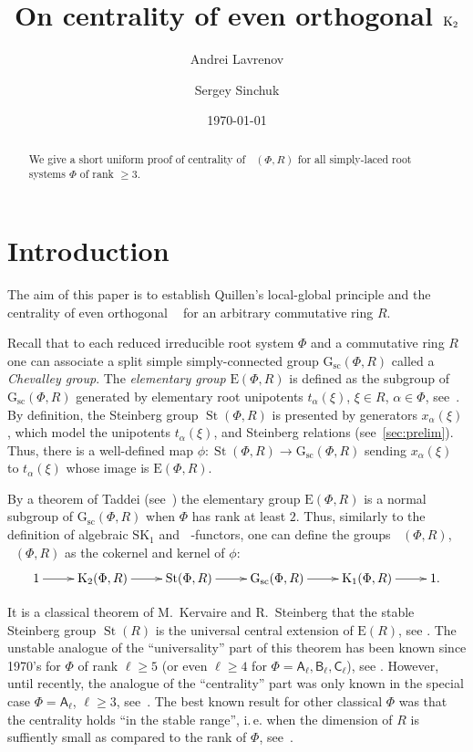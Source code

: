 \documentclass[11pt]{amsart}
\title{On centrality of even orthogonal $\Kt$}
\author {Andrei Lavrenov}
\author{Sergey Sinchuk}
\date {\today}
\theoremstyle{plain} \declaretheorem[name=Theorem, Refname={Theorem,Theorems}]{tm} \Crefname{tm}{Theorem}{Theorems}
\numberwithin{equation}{section}
\theoremstyle{definition} \newtheorem{df}[lm]{Definition} \Crefname{df}{Definition}{Definitions}
\theoremstyle{remark} \newtheorem{rk}[lm]{Remark} \Crefname{rk}{Remark}{Remarks}
\newcommand{\E}{{\mathrm{E}}}
\newcommand{\GG}{{\mathrm{G}_{\mathrm{sc}}}}
\newcommand{\St}{\mathop{\mathrm{St}}\nolimits}
\newcommand{\Kt}{\mathop{\mathrm{K_2}}\nolimits}
\newcommand{\Ko}{\mathop{\mathrm{K_1}}\nolimits}
\newcommand{\rA}{\mathsf{A}}
\newcommand{\rB}{\mathsf{B}}
\newcommand{\rC}{\mathsf{C}}
\begin{document}
\begin{abstract} We give a short uniform proof of centrality of $\Kt(\Phi, R)$ for all simply-laced root systems $\Phi$ of rank $\geq 3$.
\end{abstract}

\maketitle

\section*{Introduction}
The aim of this paper is to establish Quillen's local-global principle and the centrality of even orthogonal $\Kt$ for an arbitrary commutative ring $R$.

Recall that to each reduced irreducible root system $\Phi$ and a commutative ring $R$ one can associate a split simple simply-connected group $\GG(\Phi, R)$ called a \emph{Chevalley group}.
The {\it elementary group} $\E(\Phi, R)$ is defined as the subgroup of $\GG(\Phi, R)$ generated by elementary root unipotents $t_\alpha(\xi)$, $\xi\in R$, $\alpha\in \Phi$, see~\cite{Ta, St78}.
By definition, the Steinberg group $\St(\Phi, R)$ is presented by generators $x_\alpha(\xi)$, which model the unipotents $t_\alpha(\xi)$, and Steinberg relations (see~\cref{sec:prelim}). 
Thus, there is a well-defined map $\phi\colon\St(\Phi, R)\to \GG(\Phi, R)$ sending $x_\alpha(\xi)$ to $t_\alpha(\xi)$ whose image is $\E(\Phi, R)$.

By a theorem of Taddei (see~\cite{Ta}) the elementary group $\E(\Phi, R)$ is a normal subgroup of $\GG(\Phi, R)$ when $\Phi$ has rank at least $2$.
Thus, similarly to the definition of algebraic $\mathrm{SK}_1$ and $\Kt$-functors, one can define the groups $\Ko(\Phi, R)$, $\Kt(\Phi, R)$ as the cokernel and kernel of $\phi$:
$$\xymatrix{1 \ar[r] & \Kt(\Phi, R) \ar[r] & \St(\Phi, R) \ar[r] & \GG(\Phi, R) \ar[r] & \Ko(\Phi, R) \ar[r] & 1.}$$

It is a classical theorem of M.~Kervaire and R.~Steinberg that the stable Steinberg group $\St(R)$ is the universal central extension of $\E(R)$, see \cite[Theorem~III.5.5]{Kbook}.
The unstable analogue of the ``universality'' part of this theorem has been known since 1970's for $\Phi$ of rank $\ell \geq 5$ (or even $\ell \geq 4$ for $\Phi=\rA_\ell, \rB_\ell, \rC_\ell$), see \cite{St1, KaS}.
However, until recently, the analogue of the ``centrality'' part was only known in the special case $\Phi=\rA_\ell$, $\ell\geq 3$, see~\cite[Corollary~2]{vdK}.
The best known result for other classical $\Phi$ was that the centrality holds ``in the stable range'',
i.\,e. when the dimension of $R$ is suffiently small as compared to the rank of $\Phi$, see~\cite[Corollary~3.4]{St78}.
\end{document}
